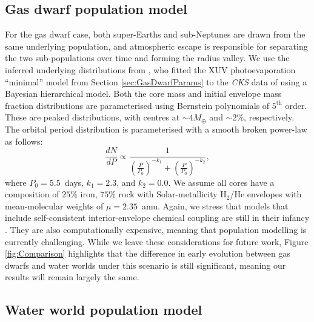 \documentclass[fleqn,usenatbib]{mnras}
\begin{document}
\subsection{Gas dwarf population model}


For the gas dwarf case, both super-Earths and sub-Neptunes are drawn from the same underlying population, and atmospheric escape is responsible for separating the two sub-populations over time and forming the radius valley. We use the inferred underlying distributions from \citet{Rogers2021}, who fitted the XUV photoevaporation ``minimal'' model from Section \ref{sec:GasDwarfParams} to the \textit{CKS} data of \citet{Fulton2018} using a Bayesian hierarchical model. Both the core mass and initial envelope mass fraction distributions are parameterised using Bernstein polynomials of $5^{\text{th}}$ order. These are peaked distributions, with centres at $\sim 4M_\oplus$ and $\sim 2\%$, respectively. The orbital period distribution is parameterised with a smooth broken power-law as follows:
\begin{equation} \label{eq:Porb_dist}
    \frac{dN}{dP} \propto \frac{1}{(\frac{P}{P_0})^{-k_1} + (\frac{P}{P_0})^{-k_2}},
\end{equation}
where $P_0 = 5.5$~days, $k_1 = 2.3$, and $k_2=0.0$. We assume all cores have a composition of $25\%$ iron, $75\%$ rock \citep{Rogers2021,Rogers2023} with Solar-metallicity H$_2$/He envelopes with mean-molecular weights of $\mu=2.35$~amu. Again, we stress that models that include self-consistent interior-envelope chemical coupling are still in their infancy \citep[e.g.][]{Kite2021,Schlichting2022,Misener2023}. They are also computationally expensive, meaning that population modelling is currently challenging. While we leave these considerations for future work, Figure \ref{fig:Comparison} highlights that the difference in early evolution between gas dwarfs and water worlds under this scenario is still significant, meaning our results will remain largely the same. 

\subsection{Water world population model}
\end{document}
